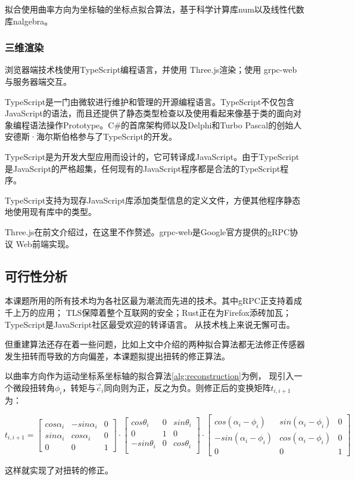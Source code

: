 拟合使用曲率方向为坐标轴的坐标点拟合算法，基于科学计算库num以及线性代数库nalgebra。

\subsubsection{三维渲染}

浏览器端技术栈使用TypeScript编程语言，并使用 Three.js渲染；使用 grpc-web 与服务器端交互。

TypeScript是一门由微软进行维护和管理的开源编程语言。TypeScript不仅包含JavaScript的语法，而且还提供了静态类型检查以及使用看起来像基于类的面向对象编程语法操作Prototype。C\#的首席架构师以及Delphi和Turbo Pascal的创始人安德斯·海尔斯伯格参与了TypeScript的开发。

TypeScript是为开发大型应用而设计的，它可转译成JavaScript。由于TypeScript是JavaScript的严格超集，任何现有的JavaScript程序都是合法的TypeScript程序。

TypeScript支持为现存JavaScript库添加类型信息的定义文件，方便其他程序静态地使用现有库中的类型。

Three.js在前文介绍过，在这里不作赘述。grpc-web是Google官方提供的gRPC协议 Web前端实现。

\subsection{可行性分析}

本课题所用的所有技术均为各社区最为潮流而先进的技术。其中gRPC正支持着成千上万的应用；
TLS保障着整个互联网的安全；Rust正在为Firefox添砖加瓦；TypeScript是JavaScript社区最受欢迎的转译语言。
从技术栈上来说无懈可击。

但重建算法还存在着一些问题，比如上文中介绍的两种拟合算法都无法修正传感器发生扭转而导致的方向偏差，本课题拟提出扭转的修正算法。

以曲率方向作为运动坐标系坐标轴的拟合算法\ref{alg:reconstruction}为例，
现引入一个微段扭转角$\phi_i$，转矩与$\vec c_i$同向则为正，反之为负。则修正后的变换矩阵$t_{i, i+1}$为：

\begin{equation}
t_{i, i+1} = \left[
    \begin{matrix}
        cos \alpha_i & -sin \alpha_i & 0 \\
        sin \alpha_i & cos \alpha_i & 0 \\
        0 & 0 & 1
    \end{matrix}
    \right]
    \cdot
    \left[
    \begin{matrix}
        cos \theta_i & 0 & sin \theta_i \\
        0 & 1 & 0 \\
        -sin \theta_i & 0 & cos \theta_i \\
    \end{matrix}
    \right]
    \cdot
    \left[
    \begin{matrix}
        cos (\alpha_i - \phi_i) & sin (\alpha_i - \phi_i) & 0 \\
        -sin (\alpha_i - \phi_i) & cos (\alpha_i - \phi_i) & 0 \\
        0 & 0 & 1
    \end{matrix}
\right]
\end{equation}

这样就实现了对扭转的修正。